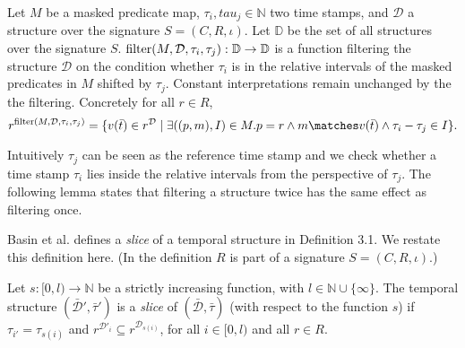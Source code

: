 \begin{definition}
    \label{def:filter}
    Let $M$ be a masked predicate map, $\tau_i, tau_j \in \mathbb{N}$ two time stamps, and $\mathcal{D}$ a structure over the signature $S = (C,R,\iota)$.
    Let $\mathbb{D}$ be the set of all structures over the signature $S$.
    $\operatorname{filter}(M, \mathcal{D}, \tau_i, \tau_j) : \mathbb{D} \to \mathbb{D}$ is a function filtering the structure $\mathcal{D}$ on the condition whether $\tau_i$ is in the relative intervals of the masked predicates in $M$ shifted by $\tau_j$.
    Constant interpretations remain unchanged by the the filtering.
    Concretely for all $r \in R$, 
    \begin{equation*}
        r^{\filter(M, \mathcal{D}, \tau_i, \tau_j)} 
        = \{v(\bar{t}) \in r^{\mathcal{D}} \mid 
            \exists ((p,m), I) \in M. 
                p = r \land m \matches v(\bar{t}) 
                \land \tau_i - 
                \tau_j \in I \}.
    \end{equation*}
\end{definition}
Intuitively $\tau_j$ can be seen as the reference time stamp and we check whether a time stamp $\tau_i$ lies inside the relative intervals from the perspective of $\tau_j$.
The following lemma states that filtering a structure twice has the same effect as filtering once.




Basin et al. \cite{Basin2016} defines a \textit{slice} of a temporal structure in Definition 3.1.
We restate this definition here.
(In the definition $R$ is part of a signature $S=(C,R,\iota)$.)
\begin{definition}
    \label{def:slice}
    Let $s : [0,l) \to \mathbb{N}$ be a strictly increasing function, with $l \in \mathbb{N} \cup \{\infty\}$.
    The temporal structure $(\bar{\mathcal{D}}', \bar{\tau}')$ is a \textit{slice} of $(\bar{\mathcal{D}}, \bar{\tau})$ (with respect to the function $s$) if $\tau_{i'} = \tau_{s(i)}$ and $r^{\mathcal{D}'_i} \subseteq r^{\mathcal{D}_{s(i)}}$, for all $i \in [0,l)$ and all $r \in R$.
\end{definition}

